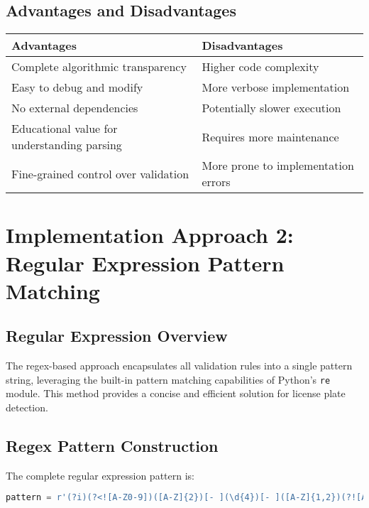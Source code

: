 \documentclass[12pt,a4paper]{article}
\begin{document}
\subsection{Advantages and Disadvantages}
\begin{center}
\begin{tabular}{|p{}|p{}|}
\hline
\textbf{Advantages} & \textbf{Disadvantages} \\
\hline
Complete algorithmic transparency & Higher code complexity \\
Easy to debug and modify & More verbose implementation \\
No external dependencies & Potentially slower execution \\
Educational value for understanding parsing & Requires more maintenance \\
Fine-grained control over validation & More prone to implementation errors \\
\hline
\end{tabular}
\end{center}

\section{Implementation Approach 2: Regular Expression Pattern Matching}
\subsection{Regular Expression Overview}
The regex-based approach encapsulates all validation rules into a single pattern string, leveraging the built-in pattern matching capabilities of Python's \texttt{re} module. This method provides a concise and efficient solution for license plate detection.

\subsection{Regex Pattern Construction}
The complete regular expression pattern is:
\begin{lstlisting}[language=Python, frame=single]
pattern = r'(?i)(?<![A-Z0-9])([A-Z]{2})[- ](\d{4})[- ]([A-Z]{1,2})(?![A-Z0-9])'
\end{lstlisting}
\end{document}
